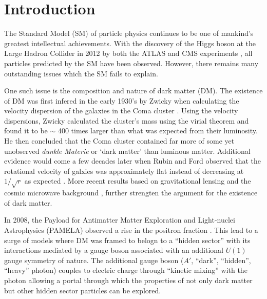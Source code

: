 
\chapter{Introduction}

The Standard Model (SM) of particle physics continues to be one of mankind's 
greatest intellectual achievements. With the discovery of the Higgs boson at the
Large Hadron Collider in 2012 by both the ATLAS and CMS experiments
\cite{Aad:2012tfa, Chatrchyan:2012xdj}, all particles predicted by the SM have
been observed.  However, there remains many outstanding issues which the SM
fails to explain.  

One such issue is the composition and nature of dark matter (DM). The 
existence of DM was first infered in the early 1930's by Zwicky when calculating
the velocity dispersion of the galaxies in the Coma cluster 
\cite{Zwicky:1933gu}.  Using the velocity dispersions, Zwicky calculated the 
cluster's mass using the virial theorem and found it to be $\sim$ 400 times 
larger than what was expected from their luminosity.  He then concluded that 
the Coma cluster contained far more of some yet unobserved \emph{dunkle Materie}
or `dark matter' than luminous matter.  Additional evidence would come 
a few decades later when Rubin and Ford observed that the rotational velocity
of galxies was approximately flat instead of decreasing at $1/\sqrt{r}$ as 
expected \cite{Rubin:1980zd}.  More recent results based on gravitational
lensing \cite{Clowe:2006eq} and the cosmic microwave background 
\cite{Adam:2015rua}, further strengten the argument for the existence of dark 
matter.

In 2008, the Payload for Antimatter Matter Exploration and Light-nuclei 
Astrophysics (PAMELA) observed a rise in the positron fraction \cite{}.  This
lead to a surge of models where DM was framed to belogn to a ``hidden sector''
with its interactions mediated by a gauge boson associated with an additional
$U(1)$ gauge symmetry of nature.  The additional gauge boson  ($A'$, ``dark'',
``hidden'', ``heavy'' photon) couples to electric charge through ``kinetic 
mixing'' with the photon allowing a portal through which the properties of not
only dark matter but other hidden sector particles can be explored.
